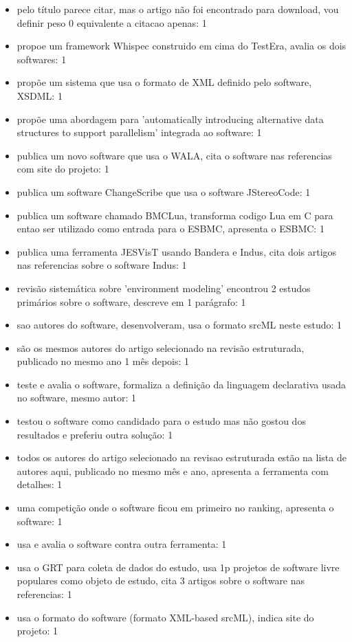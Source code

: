 \begin{itemize}
\item pelo título parece citar, mas o artigo não foi encontrado para download, vou definir peso 0 equivalente a citacao apenas: 1
\item propoe um framework Whispec construido em cima do TestEra, avalia os dois softwares: 1
\item propõe um sistema que usa o formato de XML definido pelo software, XSDML: 1
\item propõe uma abordagem para 'automatically introducing alternative data structures to support parallelism' integrada ao software: 1
\item publica um novo software que usa o WALA, cita o software nas referencias com site do projeto: 1
\item publica um software ChangeScribe que usa o software JStereoCode: 1
\item publica um software chamado BMCLua, transforma codigo Lua em C para entao ser utilizado como entrada para o ESBMC, apresenta o ESBMC: 1
\item publica uma ferramenta JESVisT usando Bandera e Indus, cita dois artigos nas referencias sobre o software Indus: 1
\item revisão sistemática sobre 'environment modeling' encontrou 2 estudos primários sobre o software, descreve em 1 parágrafo: 1
\item sao autores do software, desenvolveram, usa o formato srcML neste estudo: 1
\item são os mesmos autores do artigo selecionado na revisão estruturada, publicado no mesmo ano 1 mês depois: 1
\item teste e avalia o software, formaliza a definição da linguagem declarativa usada no software, mesmo autor: 1
\item testou o software como candidado para o estudo mas não gostou dos resultados e preferiu outra solução: 1
\item todos os autores do artigo selecionado na revisao estruturada estão na lista de autores aqui, publicado no mesmo mês e ano, apresenta a ferramenta com detalhes: 1
\item uma competição onde o software ficou em primeiro no ranking, apresenta o software: 1
\item usa e avalia o software contra outra ferramenta: 1
\item usa o GRT para coleta de dados do estudo, usa 1p projetos de software livre populares como objeto de estudo, cita 3 artigos sobre o software nas referencias: 1
\item usa o formato do software (formato XML-based srcML), indica site do projeto: 1

\end{itemize}
